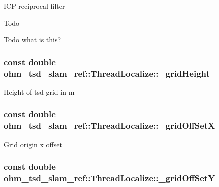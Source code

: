 I\-C\-P reciprocal filter \begin{DoxyRefDesc}{Todo}
\item[\hyperlink{todo__todo000022}{Todo}]what is this? \end{DoxyRefDesc}
\hypertarget{classohm__tsd__slam__ref_1_1ThreadLocalize_af9493e2cbbce37f693bbe632374d0d2a}{
\subsubsection[{\-\_\-grid\-Height}]{\setlength{\rightskip}{0pt plus 5cm}const double ohm\-\_\-tsd\-\_\-slam\-\_\-ref\-::\-Thread\-Localize\-::\-\_\-grid\-Height\hspace{0.3cm}{\ttfamily [private]}}}\label{classohm__tsd__slam__ref_1_1ThreadLocalize_af9493e2cbbce37f693bbe632374d0d2a}
Height of tsd grid in m \hypertarget{classohm__tsd__slam__ref_1_1ThreadLocalize_a74254a193f989fd948778e780a340b9c}{
\subsubsection[{\-\_\-grid\-Off\-Set\-X}]{\setlength{\rightskip}{0pt plus 5cm}const double ohm\-\_\-tsd\-\_\-slam\-\_\-ref\-::\-Thread\-Localize\-::\-\_\-grid\-Off\-Set\-X\hspace{0.3cm}{\ttfamily [private]}}}\label{classohm__tsd__slam__ref_1_1ThreadLocalize_a74254a193f989fd948778e780a340b9c}
Grid origin x offset \hypertarget{classohm__tsd__slam__ref_1_1ThreadLocalize_ab12390e3a1727f9d1c47fc96747bd96c}{
\subsubsection[{\-\_\-grid\-Off\-Set\-Y}]{\setlength{\rightskip}{0pt plus 5cm}const double ohm\-\_\-tsd\-\_\-slam\-\_\-ref\-::\-Thread\-Localize\-::\-\_\-grid\-Off\-Set\-Y\hspace{0.3cm}{\ttfamily [private]}}}\label{classohm__tsd__slam__ref_1_1ThreadLocalize_ab12390e3a1727f9d1c47fc96747bd96c}
